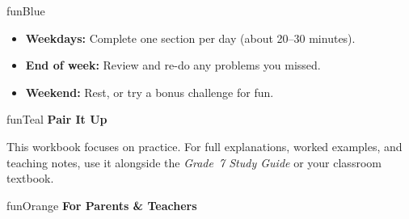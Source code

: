 {\begin{center}
\begin{minipage}{0.84\textwidth}
\begin{wbDashBox}{funBlue}
    \vspace{3mm}

    \begin{itemize}[leftmargin=1.2em, itemsep=2pt]
        \item[\textcolor{funBlueDark}{\faAngleDoubleRight}]
            \textbf{Weekdays:} Complete one section per day
            (about 20--30 minutes).
        \item[\textcolor{funBlueDark}{\faAngleDoubleRight}]
            \textbf{End of week:} Review and re-do any problems
            you missed.
        \item[\textcolor{funBlueDark}{\faAngleDoubleRight}]
            \textbf{Weekend:} Rest, or try a bonus challenge for fun.
    \end{itemize}
\end{wbDashBox}
\end{minipage}
\end{center}

\vspace{4mm}

\begin{center}
\begin{minipage}{0.84\textwidth}
\begin{wbDashBox}{funTeal}
    {\bfseries\color{black!80}\faLink\hspace{2mm}Pair It Up}

    \vspace{2mm}

    This workbook focuses on practice. For full explanations, worked
    examples, and teaching notes, use it alongside the \textit{Grade~7
    Study Guide} or your classroom textbook.
\end{wbDashBox}
\end{minipage}
\end{center}

\vspace{4mm}

\begin{center}
\begin{minipage}{0.84\textwidth}
\begin{wbDashBox}{funOrange}
    {\bfseries\color{black!80}\faUsers\hspace{2mm}For Parents \& Teachers}

    \vspace{2mm}


\end{wbDashBox}
\end{minipage}
\end{center}}
